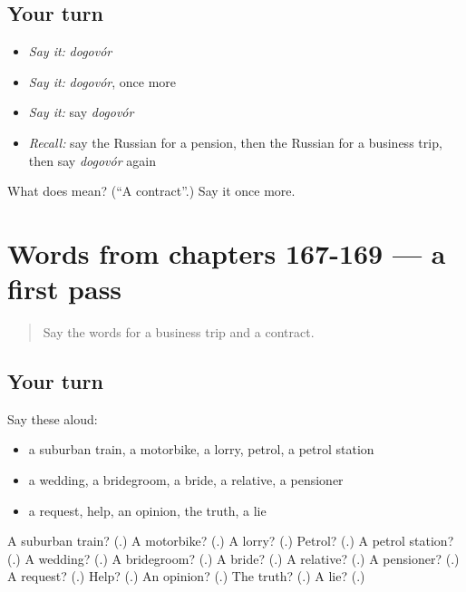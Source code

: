 \subsection*{Your turn}
\begin{itemize}
\raggedright
  \item \emph{Say it:} \emph{dogovór}
  \item \emph{Say it:} \emph{dogovór}, once more
  \item \emph{Say it:} say \emph{dogovór}
  \item \emph{Recall:} say the Russian for a pension, then the Russian for a business trip, then say \emph{dogovór} again
\end{itemize}

\begin{tcolorbox}[breakable,colback=teal!4,colframe=teal!35!black,title={Before you move on}]
What does  mean? (\textquotedblleft{}A contract\textquotedblright{}.) Say it once more.
\end{tcolorbox}
\section[(dialogue)]{Words from chapters 167-169 — a first pass}

\label{lesson:RU-R172-first-pass-words-from-chapters-167-169}



\begin{quote}
Say the words for a business trip and a contract.
\end{quote}

\subsection*{Your turn}
Say these aloud:

\begin{itemize}
\raggedright
  \item a suburban train, a motorbike, a lorry, petrol, a petrol station
  \item a wedding, a bridegroom, a bride, a relative, a pensioner
  \item a request, help, an opinion, the truth, a lie
\end{itemize}

\begin{tcolorbox}[breakable,colback=teal!4,colframe=teal!35!black,title={Before you move on}]
A suburban train? (\textbf{}.) A motorbike? (\textbf{}.) A lorry? (\textbf{}.) Petrol? (\textbf{}.) A petrol station? (\textbf{}.) A wedding? (\textbf{}.) A bridegroom? (\textbf{}.) A bride? (\textbf{}.) A relative? (\textbf{}.) A pensioner? (\textbf{}.) A request? (\textbf{}.) Help? (\textbf{}.) An opinion? (\textbf{}.) The truth? (\textbf{}.) A lie? (\textbf{}.)
\end{tcolorbox}
